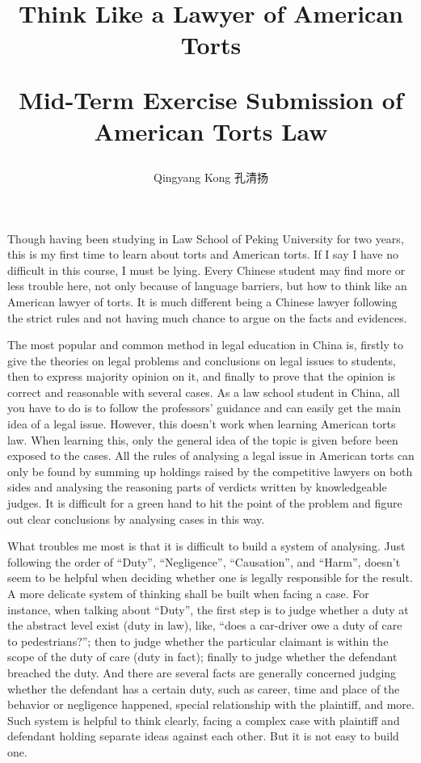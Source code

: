 \documentclass[10pt,a4paper]{ctexart}
\author{Qingyang Kong  孔清扬}
\title{Think Like a Lawyer of American Torts\\ \begin{small}Mid-Term Exercise Submission of American Torts Law\end{small}}
\begin{document}
\maketitle


Though having been studying in Law School of Peking University for two years, this is my first time to learn about torts and American torts. If I say I have no difficult in this course, I must be lying. Every Chinese student may find more or less trouble here, not only because of language barriers, but how to think like an American lawyer of torts. It is much different being a Chinese lawyer following the strict rules and not having much chance to argue on the facts and evidences. 

The most popular and common method in legal education in China is, firstly to give the theories on legal problems and conclusions on legal issues to students, then to express majority opinion on it, and finally to prove that the opinion is correct and reasonable with several cases. As a law school student in China, all you have to do is to follow the professors’ guidance and can easily get the main idea of a legal issue. However, this doesn’t work when learning American torts law. When learning this, only the general idea of the topic is given before been exposed to the cases. All the rules of analysing a legal issue in American torts can only be found by summing up holdings raised by the competitive lawyers on both sides and analysing the reasoning parts of verdicts written by knowledgeable judges. It is difficult for a green hand to hit the point of the problem and figure out clear conclusions by analysing cases in this way. 

What troubles me most is that it is difficult to build a system of analysing. Just following the order of “Duty”, “Negligence”, “Causation”, and “Harm”, doesn’t seem to be helpful when deciding whether one is legally responsible for the result. A more delicate system of thinking shall be built when facing a case. For instance, when talking about “Duty”, the first step is to judge whether a duty at the abstract level exist (duty in law), like, “does a car-driver owe a duty of care to pedestrians?”; then to judge whether the particular claimant is within the scope of the duty of care (duty in fact); finally to judge whether the defendant breached the duty. And there are several facts are generally concerned judging whether the defendant has a certain duty, such as career, time and place of the behavior or negligence happened, special relationship with the plaintiff, and more. Such system is helpful to think clearly, facing a complex case with plaintiff and defendant holding separate ideas against each other. But it is not easy to build one. 
\end{document}

